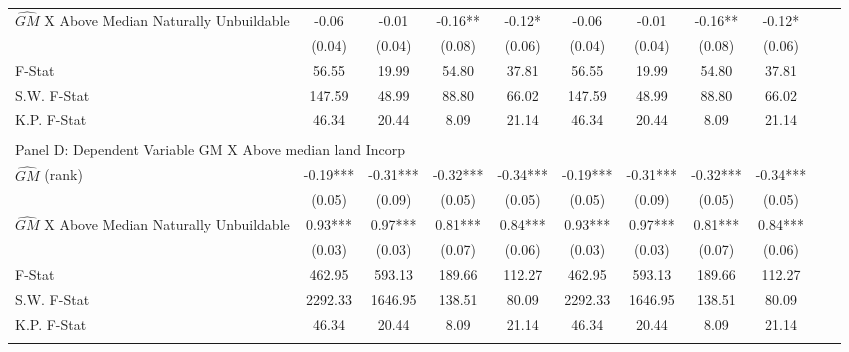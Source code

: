 \begin{table}[htbp]
\begin{threeparttable}
\begin{tabular}{l*{10}{c}}
\addlinespace
$\hat{GM}$ X Above Median Naturally Unbuildable&      -0.06   &      -0.01   &      -0.16** &      -0.12*  &      -0.06   &      -0.01   &      -0.16** &      -0.12*  \\
                &     (0.04)   &     (0.04)   &     (0.08)   &     (0.06)   &     (0.04)   &     (0.04)   &     (0.08)   &     (0.06)   \\
\midrule
F-Stat          &      56.55   &      19.99   &      54.80   &      37.81   &      56.55   &      19.99   &      54.80   &      37.81   \\
S.W. F-Stat     &     147.59   &      48.99   &      88.80   &      66.02   &     147.59   &      48.99   &      88.80   &      66.02   \\
K.P. F-Stat     &      46.34   &      20.44   &       8.09   &      21.14   &      46.34   &      20.44   &       8.09   &      21.14   \\
\cmidrule[\heavyrulewidth](lr){1-9} \\ \cmidrule[\heavyrulewidth](lr){1-9}
\multicolumn{8}{l}{Panel D: Dependent Variable GM X Above median land Incorp}\\
\cmidrule(lr){1-9}
$\hat{GM}$ (rank)&      -0.19***&      -0.31***&      -0.32***&      -0.34***&      -0.19***&      -0.31***&      -0.32***&      -0.34***\\
                &     (0.05)   &     (0.09)   &     (0.05)   &     (0.05)   &     (0.05)   &     (0.09)   &     (0.05)   &     (0.05)   \\
\addlinespace
$\hat{GM}$ X Above Median Naturally Unbuildable&       0.93***&       0.97***&       0.81***&       0.84***&       0.93***&       0.97***&       0.81***&       0.84***\\
                &     (0.03)   &     (0.03)   &     (0.07)   &     (0.06)   &     (0.03)   &     (0.03)   &     (0.07)   &     (0.06)   \\
\midrule
F-Stat          &     462.95   &     593.13   &     189.66   &     112.27   &     462.95   &     593.13   &     189.66   &     112.27   \\
S.W. F-Stat     &    2292.33   &    1646.95   &     138.51   &      80.09   &    2292.33   &    1646.95   &     138.51   &      80.09   \\
K.P. F-Stat     &      46.34   &      20.44   &       8.09   &      21.14   &      46.34   &      20.44   &       8.09   &      21.14   \\
\cmidrule[\heavyrulewidth](lr){1-9} \\ \cmidrule[\heavyrulewidth](lr){1-9}

\end{tabular}
\end{threeparttable}
\end{table}
